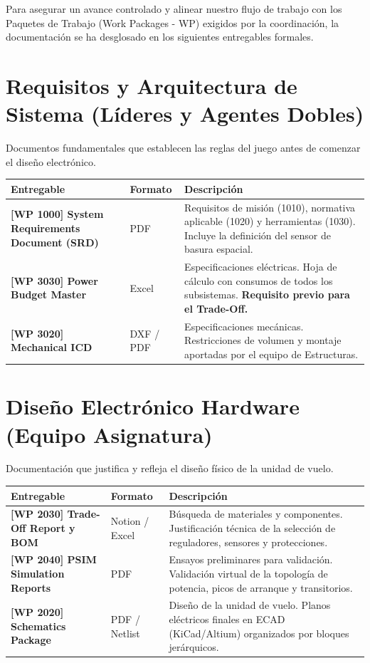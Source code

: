 
\noindent Para asegurar un avance controlado y alinear nuestro flujo de trabajo con los Paquetes de Trabajo (Work Packages - WP) exigidos por la coordinación, la documentación se ha desglosado en los siguientes entregables formales.

\section{Requisitos y Arquitectura de Sistema (Líderes y Agentes Dobles)}
\noindent Documentos fundamentales que establecen las reglas del juego antes de comenzar el diseño electrónico.

\begin{table}[H]
\centering
\renewcommand{\arraystretch}{1.5}
\begin{tabularx}{\textwidth}{>{\hsize=0.8\hsize}X >{\hsize=0.3\hsize}X >{\hsize=1.9\hsize}X}
\toprule
\textbf{Entregable} & \textbf{Formato} & \textbf{Descripción} \\ \midrule
\textbf{[WP 1000] System Requirements Document (SRD)} & PDF & Requisitos de misión (1010), normativa aplicable (1020) y herramientas (1030). Incluye la definición del sensor de basura espacial. \\ 
\textbf{[WP 3030] Power Budget Master} & Excel & Especificaciones eléctricas. Hoja de cálculo con consumos de todos los subsistemas. \textbf{Requisito previo para el Trade-Off.} \\ 
\textbf{[WP 3020] Mechanical ICD} & DXF / PDF & Especificaciones mecánicas. Restricciones de volumen y montaje aportadas por el equipo de Estructuras. \\ \bottomrule
\end{tabularx}
\end{table}
\clearpage
\section{Diseño Electrónico Hardware (Equipo Asignatura)}
\noindent Documentación que justifica y refleja el diseño físico de la unidad de vuelo.

\begin{table}[H]
\centering
\renewcommand{\arraystretch}{1.5}
\begin{tabularx}{\textwidth}{>{\hsize=0.8\hsize}X >{\hsize=0.3\hsize}X >{\hsize=1.9\hsize}X}
\toprule
\textbf{Entregable} & \textbf{Formato} & \textbf{Descripción} \\ \midrule
\textbf{[WP 2030] Trade-Off Report y BOM} & Notion / Excel & Búsqueda de materiales y componentes. Justificación técnica de la selección de reguladores, sensores y protecciones. \\ 
\textbf{[WP 2040] PSIM Simulation Reports} & PDF & Ensayos preliminares para validación. Validación virtual de la topología de potencia, picos de arranque y transitorios. \\ 
\textbf{[WP 2020] Schematics Package} & PDF / Netlist & Diseño de la unidad de vuelo. Planos eléctricos finales en ECAD (KiCad/Altium) organizados por bloques jerárquicos. \\ \bottomrule
\end{tabularx}
\end{table}

